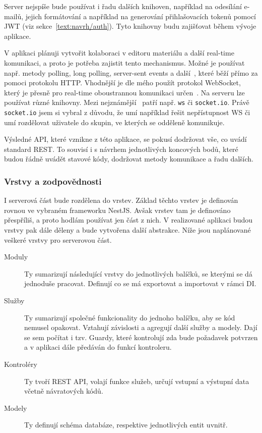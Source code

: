 Server nejspíše bude používat i řadu dalších knihoven, například na odesílání e-mailů, jejich formátování a například na generování přihlašovacích tokenů pomocí JWT (viz sekce~\ref{text:navrh/auth}).
Tyto knihovny budu zajišťovat během vývoje aplikace.

V aplikaci plánuji vytvořit kolaboraci v editoru materiálu a další real-time komunikaci, a proto je potřeba zajistit tento mechanismus.
Možné je používat např. metody polling, long polling, server-sent events a další~\cite{subramanian_2021}, které běží přímo za pomoci protokolu HTTP.
Vhodnější je dle mého použít protokol WebSocket, který je přesně pro real-time oboustrannou komunikaci určen~\cite{rfc6455}.
Na serveru lze používat různé knihovny.
Mezi nejznámější~\cite{uzayr2022frontend} patří např. \verb|ws| či \verb|socket.io|.
Právě \verb|socket.io| jsem si vybral z důvodu, že umí například řešit nepřístupnost WS či umí rozdělovat uživatele do skupin, ve kterých se odděleně komunikuje.

Výsledné API, které vznikne z této aplikace, se pokusí dodržovat vše, co uvádí standard REST.
To souvisí i s návrhem jednotlivých koncových bodů, které budou řádně uvádět stavové kódy, dodržovat metody komunikace a řadu dalších.

\subsubsection{Vrstvy a zodpovědnosti}

I serverová část bude rozdělena do vrstev. 
Základ těchto vrstev je definován rovnou ve vybraném frameworku NestJS.
Avšak vrstev tam je definováno přespříliš, a proto hodlám používat jen část z nich.
V realizované aplikaci budou vrstvy pak dále děleny a bude vytvořena další abstrakce.
Níže jsou naplánované veškeré vrstvy pro serverovou část.

\begin{description}
    \item[Moduly] Ty sumarizují následující vrstvy do jednotlivých balíčků, se kterými se dá jednoduše pracovat. Definují co se má exportovat a importovat v rámci DI.
    \item[Služby] Ty sumarizují společné funkcionality do jednoho balíčku, aby se kód nemusel opakovat. Vztahují závislosti a agregují další služby a modely. Dají se sem počítat i tzv. Guardy, které kontrolují zda bude požadavek potvrzen a v aplikaci dále předáván do funkcí kontroleru.
    \item[Kontroléry] Ty tvoří REST API, volají funkce služeb, určují vstupní a výstupní data včetně návratových kódů.
    \item[Modely] Ty definují schéma databáze, respektive jednotlivých entit uvnitř.
\end{description}


